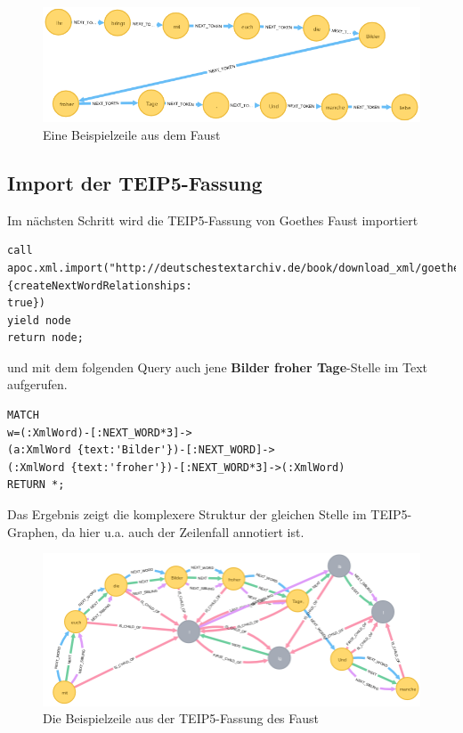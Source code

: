 \begin{figure}
\centering
\includegraphics{Bilder/TEI2Graph/BilderFroherTage.png}
\caption{Eine Beispielzeile aus dem Faust}
\end{figure}

\hypertarget{import-der-teip5-fassung}{%
\subsection{Import der TEIP5-Fassung}\label{import-der-teip5-fassung}}

Im nächsten Schritt wird die TEIP5-Fassung von Goethes Faust importiert

\begin{verbatim}
call
apoc.xml.import("http://deutschestextarchiv.de/book/download_xml/goethe_faust01_1808",{createNextWordRelationships:
true})
yield node
return node;
\end{verbatim}

und mit dem folgenden Query auch jene \textbf{Bilder froher Tage}-Stelle
im Text aufgerufen.

\begin{verbatim}
MATCH
w=(:XmlWord)-[:NEXT_WORD*3]->
(a:XmlWord {text:'Bilder'})-[:NEXT_WORD]->
(:XmlWord {text:'froher'})-[:NEXT_WORD*3]->(:XmlWord)
RETURN *;
\end{verbatim}

Das Ergebnis zeigt die komplexere Struktur der gleichen Stelle im
TEIP5-Graphen, da hier u.a. auch der Zeilenfall annotiert ist.

\begin{figure}
\centering
\includegraphics{Bilder/TEI2Graph/BilderFroherTageP5.png}
\caption{Die Beispielzeile aus der TEIP5-Fassung des Faust}
\end{figure}


